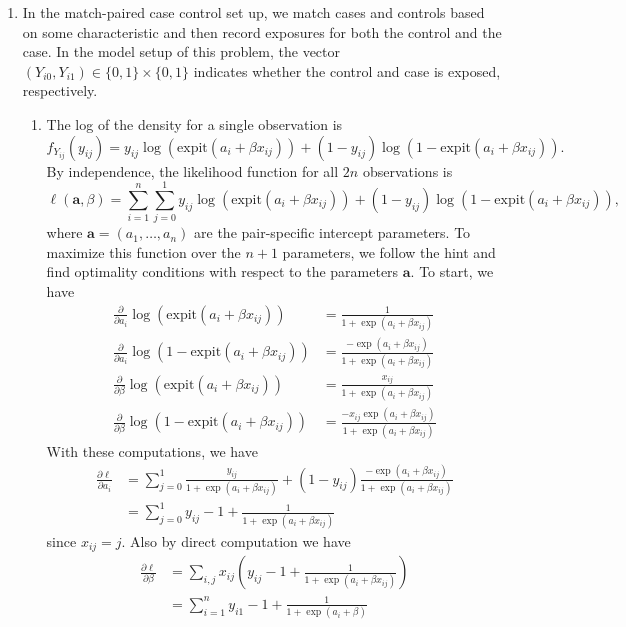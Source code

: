 \documentclass[11pt]{article}
\begin{document}
\begin{enumerate}
	\item In the match-paired case control set up, we match cases and controls based on some characteristic and then record exposures for both the control and the case. In the model setup of this problem, the vector $(Y_{i0}, Y_{i1})\in \{0,1\}\times\{0,1\}$ indicates whether the control and case is exposed, respectively.
		\begin{enumerate}
			\item The log of the density for a single observation is 
			\[
				f_{Y_{ij}}(y_{ij}) = y_{ij}\log(\mathrm{expit}(a_i+\beta x_{ij})) + (1-y_{ij})\log(1-\mathrm{expit}(a_i+\beta x_{ij})).
			\]
			By independence, the likelihood function for all $2n$ observations is
			\[
				\ell(\bm{a},\beta) = \sum_{i=1}^n\sum_{j=0}^1 y_{ij}\log(\mathrm{expit}(a_i+\beta x_{ij})) + (1-y_{ij})\log(1-\mathrm{expit}(a_i+\beta x_{ij})),
			\]
			where $\bm{a} = (a_1,\dotsc,a_n)$ are the pair-specific intercept parameters. To maximize this function over the $n+1$ parameters, we follow the hint and find optimality conditions with respect to the parameters $\bm{a}$. To start, we have
			\begin{align*}
				\frac{\partial}{\partial a_i} \log(\mathrm{expit}(a_i+\beta x_{ij})) &= \frac{1}{1+\exp(a_i+\beta x_{ij})} \\
				\frac{\partial}{\partial a_i} \log(1-\mathrm{expit}(a_i+\beta x_{ij})) &= \frac{-\exp(a_i+\beta x_{ij})}{1+\exp(a_i+\beta x_{ij})} \\
				\frac{\partial}{\partial \beta} \log(\mathrm{expit}(a_i+\beta x_{ij})) &= \frac{x_{ij}}{1+\exp(a_i+\beta x_{ij})} \\
				\frac{\partial}{\partial \beta} \log(1-\mathrm{expit}(a_i+\beta x_{ij})) &= \frac{-x_{ij}\exp(a_i+\beta x_{ij})}{1+\exp(a_i+\beta x_{ij})}
			\end{align*}
			With these computations, we have
			\begin{align*}
				\frac{\partial \ell}{\partial a_i} &= \sum_{j=0}^1 \frac{y_{ij}}{1+\exp(a_i+\beta x_{ij})} + (1-y_{ij})\frac{-\exp(a_i+\beta x_{ij})}{1+\exp(a_i+\beta x_{ij})} \\
				&= \sum_{j=0}^1 y_{ij} - 1 +\frac{1}{1+\exp(a_i+\beta x_{ij})}
			\end{align*}
			since $x_{ij}=j$. Also by direct computation we have
			\begin{align*}
				\frac{\partial \ell}{\partial \beta}  &= \sum_{i,j} x_{ij}\left(y_{ij} - 1 +\frac{1}{1+\exp(a_i+\beta x_{ij})}\right) \\
				&= \sum_{i=1}^n y_{i1} - 1 +\frac{1}{1+\exp(a_i+\beta)}

\end{align*}
\end{enumerate}
\end{enumerate}
\end{document}
